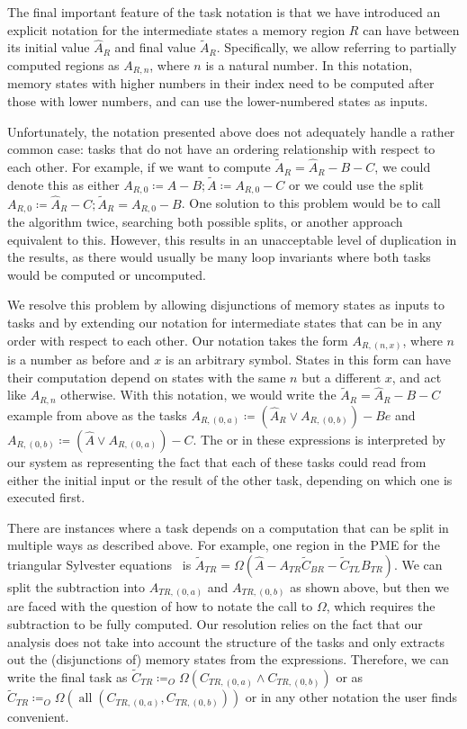 \documentclass[12pt,letterpaper]{article}
\newcommand*{\mycite}[1]{~\cite{#1}}
\begin{document}
The final important feature of the task notation is that we have introduced an explicit notation for the intermediate states a memory region $R$ can have between its initial value $\hat{A}_R$ and final value $\widetilde{A}_R$.
Specifically, we allow referring to partially computed regions as $A_{R, n}$, where $n$ is a natural number.
In this notation, memory states with higher numbers in their index need to be computed after those with lower numbers, and can use the lower-numbered states as inputs.

Unfortunately, the notation presented above does not adequately handle a rather common case: tasks that do not have an ordering relationship with respect to each other.
For example, if we want to compute $\widetilde{A}_R = \hat{A}_R - B - C$, we could denote this as either $A_{R, 0} \coloneqq \hat{A} - B; \widetilde{A} \coloneqq A_{R, 0} - C$ or we could use the split $A_{R, 0} \coloneqq \hat{A}_R - C; \widetilde{A}_R = A_{R, 0} - B$.
One solution to this problem would be to call the algorithm twice, searching both possible splits, or another approach equivalent to this.
However, this results in an unacceptable level of duplication in the results, as there would usually be many loop invariants where both tasks would be computed or uncomputed.

We resolve this problem by allowing disjunctions of memory states as inputs to tasks and by extending our notation for intermediate states that can be in any order with respect to each other.
Our notation takes the form $A_{R, (n, x)}$, where $n$ is a number as before and $x$ is an arbitrary symbol.
States in this form can have their computation depend on states with the same $n$ but a different $x$, and act like $A_{R, n}$ otherwise.
With this notation, we would write the $\widetilde{A}_R = \hat{A}_R - B - C$ example from above as the tasks $A_{R, (0, a)} \coloneqq (\hat{A}_R \vee A_{R, (0, b)}) - Be$ and $A_{R, (0, b)} \coloneqq (\hat{A} \vee A_{R, (0, a)}) - C$.
The or in these expressions is interpreted by our system as representing the fact that each of these tasks could read from either the initial input or the result of the other task, depending on which one is executed first.

There are instances where a task depends on a computation that can be split in multiple ways as described above.
For example, one region in the PME for the triangular Sylvester equations\mycite{Bientinesi2005} is $\widetilde{A}_{TR} = \Omega(\hat{A} - A_{TR}\widetilde{C}_{BR} - \widetilde{C}_{TL}B_{TR})$.
We can split the subtraction into $A_{TR, (0, a)}$ and $A_{TR, (0, b)}$ as shown above, but then we are faced with the question of how to notate the call to $\Omega$, which requires the subtraction to be fully computed.
Our resolution relies on the fact that our analysis does not take into account the structure of the tasks and only extracts out the (disjunctions of) memory states from the expressions.
Therefore, we can write the final task as $\widetilde{C}_{TR} \coloneqq_O \Omega(C_{TR, (0, a)} \wedge C_{TR, (0, b)})$ or as $\widetilde{C}_{TR} \coloneqq_O \Omega(\operatorname{all}(C_{TR, (0, a)}, C_{TR, (0, b)}))$ or in any other notation the user finds convenient.
\end{document}
